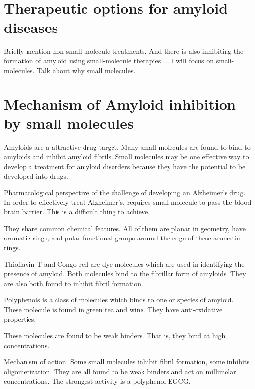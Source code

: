 \section{Therapeutic options for amyloid diseases}
\begin{outline}
  \1 Briefly mention non-small molecule treatments.
  \1 And there is also inhibiting the formation of amyloid using small-molecule therapies ... I will focus on small-molecules.  Talk about why small molecules. 
\end{outline} 


\section{Mechanism of Amyloid inhibition by small molecules}
  \begin{outline}[enumerate]
    \1 Amyloids are a attractive drug target.  Many small molecules are found to bind to amyloids and inhibit amyloid fibrils.   Small molecules may be one effective way to develop a treatment for amyloid disorders because they have the potential to be developed into drugs.
      
      \2 Pharmacological perspective of the challenge of developing an Alzheimer's drug. In order to effectively treat Alzheimer's, requires small molecule to pass the blood brain barrier.  This is a difficult thing to achieve.

      \2 They share common chemical features.  All of them are planar in geometry, have aromatic rings, and polar functional groups around the edge of these aromatic rings.

      \2 Thioflavin T and Congo red are dye molecules which are used in identifying the presence of amyloid.  Both molecules bind to the fibrillar form of amyloids. They are also both found to inhibit fibril formation.
      
      \2 Polyphenols is a class of molecules which binds to one or species of amyloid. These molecule is found in green tea and wine.  They have anti-oxidative properties.
      
    \1 These molecules are found to be weak binders.  That is, they bind at high concentrations.  
      
        \2 Mechanism of action. Some small molecules inhibit fibril formation, some inhibits oligomerization. They are all found to be weak binders and act on millimolar concentrations. The strongest activity is a polyphenol EGCG.
\end{outline}


